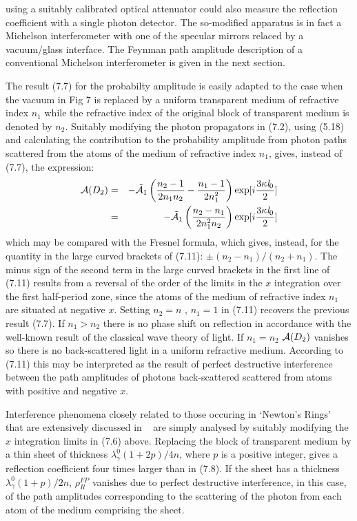 \documentclass [12pt]{article}
\begin{document}
{    using a suitably calibrated optical attenuator could also measure the reflection coefficient
    with  a single photon detector. The so-modified apparatus is in fact a Michelson interferometer
    with one of the specular mirrors relaced by a vacuum/glass interface. The Feynman path amplitude
    description of a conventional  Michelson interferometer is given in the next section.
    \par The result (7.7) for the probabilty amplitude is easily adapted to the case when the vacuum
    in Fig 7 is replaced by a uniform transparent medium of refractive index $n_1$ while the refractive
    index of the original block of transparent medium is denoted by $n_2$. Suitably modifying
     the photon propagators in (7.2), using (5.18) and calculating the contribution to the 
     probability amplitude from photon paths scattered from the atoms of the medium of refractive
     index $n_1$, gives, instead of (7.7), the expression:
  \begin{eqnarray}
  {\cal A}(D_2) & = & -\tilde{{\cal A}}_1\left(\frac{n_2-1}{2n_1n_2} - \frac{n_1-1}{2n_1^2}\right)
   \exp[i\frac{3 \kappa {\it l}_0}{2}] \nonumber \\
   & = & -\tilde{{\cal A}}_1\left(\frac{n_2-n_1}{2n_1^2 n_2}\right) \exp[i\frac{3 \kappa {\it l}_0}{2}]
  \end{eqnarray}
  which may be compared with the Fresnel formula, which gives, instead, for the quantity in the 
  large curved brackets of (7.11): $\pm(n_2-n_1)/(n_2+n_1)$.
  The minus sign of the second term in the large curved brackets in the first line of (7.11) results
   from a reversal of the order of the limits in the $x$ integration over the first half-period zone,
   since the atoms of the medium of refractive index $n_1$ are situated at negative $x$.
     Setting $n_2 = n$ , $n_1 = 1$ in (7.11) recovers the previous result (7.7). If $n_1 > n_2$ there is 
    no phase shift on reflection  in accordance with the well-known result of the classical
     wave theory of light. If $n_1 = n_2$ ${\cal A}(D_2)$ vanishes so there is no back-scattered
     light in a uniform refractive medium.
      According to (7.11) this may be interpreted as the result of perfect destructive
    interference between the path amplitudes of photons  back-scattered scattered from atoms
     with positive and negative $x$.
     \par Interference phenomena closely related to those occuring in `Newton's Rings'~\cite{Newton}
      that are extensively discussed in ~\cite{Feyn1} are simply analysed
     by suitably modifying the $x$ integration limits in (7.6) above. Replacing the block of transparent
    medium by a thin sheet of thickness $\lambda_{\gamma}^0(1+2p)/4n$, where $p$ is a positive integer,
    gives a reflection coefficient  four times larger than in (7.8). If the sheet has a thickness
    $\lambda_{\gamma}^0(1+p)/2n$,  $\rho_R^{FP}$ vanishes due to perfect destructive interference, in 
    this case,
    of the path amplitudes corresponding to the scattering of the photon from each atom of the
    medium comprising the sheet.

}
\end{document}
